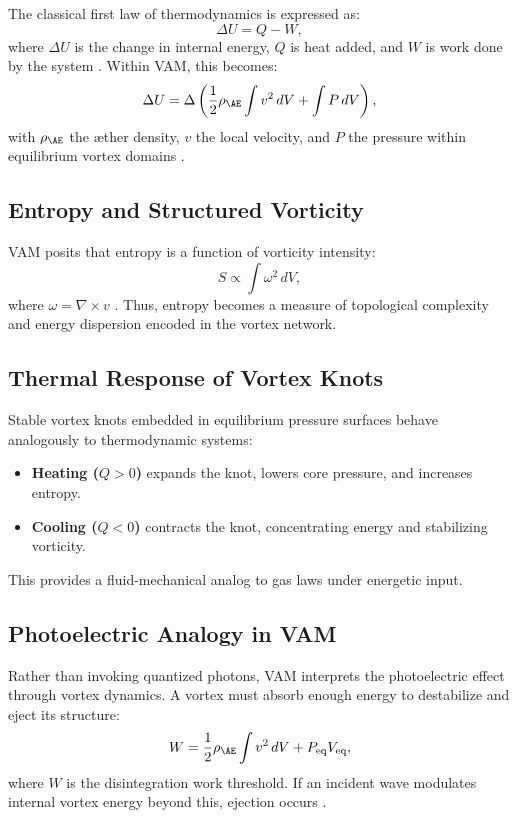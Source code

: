 The classical first law of thermodynamics is expressed as:
\begin{equation}
\Delta U = Q - W,
\end{equation}
where $\Delta U$ is the change in internal energy, $Q$ is heat added, and $W$ is work done by the system \cite{clausius1865mechanical}. Within VAM, this becomes:
\begin{equation}
\Delta U = \Delta \left( \frac{1}{2} \rho_{\AE} \int v^2 \, dV + \int P \, dV \right),
\end{equation}
with $\rho_{\AE}$ the æther density, $v$ the local velocity, and $P$ the pressure within equilibrium vortex domains \cite{vam2025unified}.

\subsection{Entropy and Structured Vorticity}

VAM posits that entropy is a function of vorticity intensity:
\begin{equation}
S \propto \int \omega^2 \, dV,
\end{equation}
where $\omega = \nabla \times v$ \cite{kelvin1867vortex}. Thus, entropy becomes a measure of topological complexity and energy dispersion encoded in the vortex network.

\subsection{Thermal Response of Vortex Knots}

Stable vortex knots embedded in equilibrium pressure surfaces behave analogously to thermodynamic systems:
\begin{itemize}
\item \textbf{Heating ($Q > 0$)} expands the knot, lowers core pressure, and increases entropy.
\item \textbf{Cooling ($Q < 0$)} contracts the knot, concentrating energy and stabilizing vorticity.
\end{itemize}
This provides a fluid-mechanical analog to gas laws under energetic input.

\subsection{Photoelectric Analogy in VAM}

Rather than invoking quantized photons, VAM interprets the photoelectric effect through vortex dynamics. A vortex must absorb enough energy to destabilize and eject its structure:
\begin{equation}
W = \frac{1}{2} \rho_{\AE} \int v^2 \, dV + P_{\text{eq}} V_{\text{eq}},
\end{equation}
where $W$ is the disintegration work threshold. If an incident wave modulates internal vortex energy beyond this, ejection occurs \cite{vam2025unified}.

